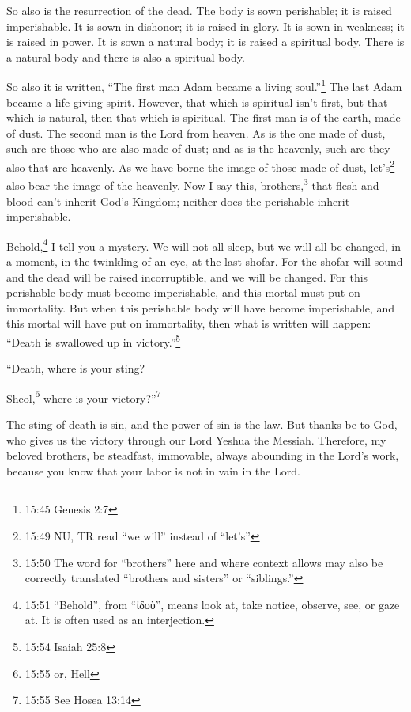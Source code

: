 \myverse{}So also is the resurrection of the dead. The body is sown perishable;
it is raised imperishable.
\myverse{}It is sown in dishonor; it is raised in glory. It is sown in weakness; it
is raised in power.
\myverse{}It is sown a natural body; it is raised a spiritual body. There is a natural
body and there is also a spiritual body.

\myverse{}So also it is written, “The first man Adam became a living soul.”\footnote{15:45 Genesis 2:7} The last Adam became a life-giving spirit.
\myverse{}However, that which is spiritual isn’t first, but that which is natural,
then that which is spiritual.
\myverse{}The first man is of the earth, made of dust. The second man is the Lord from
heaven.
\myverse{}As is the one made of dust, such are those who are also made of dust; and
as is the heavenly, such are they also that are heavenly.
\myverse{}As we have borne the image of those made of dust, let’s\footnote{15:49 NU, TR read “we will” instead of “let’s”} also bear the image of the heavenly.
\myverse{}Now I say this, brothers,\footnote{15:50 The word for “brothers” here and where context allows may also be correctly translated “brothers
	and sisters” or “siblings.”} that flesh and blood can’t inherit God’s Kingdom; neither does the
perishable inherit imperishable.

\myverse{}Behold,\footnote{15:51 “Behold”, from “ἰδοὺ”, means look at, take notice, observe, see, or gaze at. It is often used
	as an interjection.} I tell you a mystery. We will not all sleep, but we will all be changed,
\myverse{}in a moment, in the twinkling of an eye, at the last shofar. For the shofar
will sound and the dead will be raised incorruptible, and we will be changed.
\myverse{}For this perishable body must become imperishable, and this mortal must put
on immortality.
\myverse{}But when this perishable body will have become imperishable, and this mortal
will have put on immortality, then what is written will happen: “Death is swallowed up in victory.”\footnote{15:54 Isaiah 25:8}

\myverse{}“Death, where is your sting?

Sheol,\footnote{15:55 or, Hell} where is your victory?”\footnote{15:55 See
	Hosea 13:14}

\myverse{}The sting of death is sin, and the power of sin is the law.
\myverse{}But thanks be to God, who gives us the victory through our Lord Yeshua the Messiah.
\myverse{}Therefore, my beloved brothers, be steadfast, immovable, always abounding
in the Lord’s work, because you know that your labor is not in vain in the Lord.


